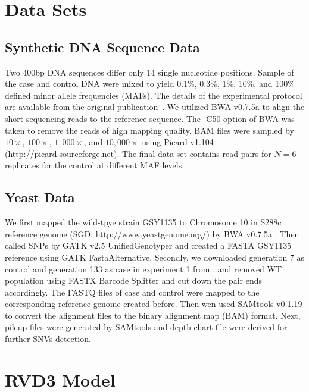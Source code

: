 \documentclass[11pt,reqno]{amsart}
\begin{document}
\section{Data Sets}

\subsection{Synthetic DNA Sequence Data}

Two 400bp DNA sequences differ only 14 single nucleotide positions. Sample of the case and control DNA were mixed to yield 0.1\%, 0.3\%, 1\%, 10\%, and 100\% defined minor allele frequencies (MAFs).
The details of the experimental protocol are available from the original publication~\citep{Flaherty:2011ja}.
We utilized BWA v0.7.5a to align the short sequencing reads to the reference sequence. The -C50 option of BWA was taken to remove the reads of high mapping quality.
BAM files were sampled by $10\times$, $100\times$, $1,000\times$, and $10,000\times$ using Picard v1.104 (http://picard.sourceforge.net).
The final data set contains read pairs for $N=6$ replicates for the control at different MAF levels.

\subsection{Yeast Data}
We first mapped the wild-tpye strain GSY1135 \citep{kvitek2011reciprocal} to Chromosome 10 in S288c reference genome (SGD; http://www.yeastgenome.org/) by BWA v0.7.5a \citep{li2009fast}.
Then called SNPs by GATK v2.5 UnifiedGenotyper \citep{McKenna:2010bva, depristo2011framework} and created a FASTA GSY1135 reference using GATK FastaAlternative.
Secondly, we downloaded generation 7 as control and generation 133 as case in experiment 1 from \citep{kvitek2013whole}, and removed WT population using FASTX Barcode Splitter and cut down the pair ends accordingly.
The FASTQ files of case and control were mapped to the corresponding reference genome created before.
Then wen used SAMtools v0.1.19 \citep{li2009sequence} to convert the alignment files to the binary alignment map (BAM) format.
Next, pileup files were generated by SAMtools and depth chart file were derived for further SNVs detection.

\section{RVD3 Model}
\end{document}
